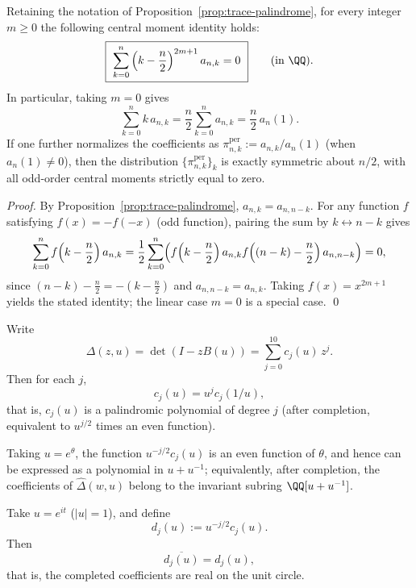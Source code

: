 \begin{corollary}\label{cor:trace-central-moments-zero}
Retaining the notation of Proposition~\ref{prop:trace-palindrome}, for every integer \(m\ge 0\) the following central moment identity holds:
$$
\boxed{\ \sum_{k=0}^{n}\left(k-\frac{n}{2}\right)^{2m+1}a_{n,k}=0\ }\qquad(\text{in }\QQ).
$$
In particular, taking \(m=0\) gives
$$
\sum_{k=0}^{n}k\,a_{n,k}=\frac{n}{2}\sum_{k=0}^{n}a_{n,k}=\frac{n}{2}\,a_n(1).
$$
If one further normalizes the coefficients as \(\pi^{\mathrm{per}}_{n,k}:=a_{n,k}/a_n(1)\) (when \(a_n(1)\neq 0\)), then the distribution \(\{\pi^{\mathrm{per}}_{n,k}\}_k\) is exactly symmetric about \(n/2\), with all odd-order central moments strictly equal to zero.
\end{corollary}
\begin{proof}
By Proposition~\ref{prop:trace-palindrome}, \(a_{n,k}=a_{n,n-k}\).
For any function \(f\) satisfying \(f(x)=-f(-x)\) (odd function), pairing the sum by \(k\leftrightarrow n-k\) gives
$$
\sum_{k=0}^{n} f\!\left(k-\frac{n}{2}\right)a_{n,k}
=\frac12\sum_{k=0}^{n}\Bigl(
f\!\left(k-\frac{n}{2}\right)a_{n,k}
f\!\left((n-k)-\frac{n}{2}\right)a_{n,n-k}
\Bigr)=0,
$$
since \((n-k)-\frac{n}{2}=-(k-\frac{n}{2})\) and \(a_{n,n-k}=a_{n,k}\).
Taking \(f(x)=x^{2m+1}\) yields the stated identity; the linear case \(m=0\) is a special case. \qed
\end{proof}

\begin{corollary}\label{cor:delta-coeff-palindrome}
Write
\[
\Delta(z,u)=\det(I-zB(u))=\sum_{j=0}^{10}c_j(u)\,z^j.
\]
Then for each $j$,
\[
c_j(u)=u^j c_j(1/u),
\]
that is, $c_j(u)$ is a palindromic polynomial of degree $j$ (after completion, equivalent to $u^{j/2}$ times an even function).
\end{corollary}

\begin{remark}
Taking $u=e^\theta$, the function $u^{-j/2}c_j(u)$ is an even function of $\theta$, and hence can be expressed as a polynomial in $u+u^{-1}$; equivalently, after completion, the coefficients of $\widehat{\Delta}(w,u)$ belong to the invariant subring $\QQ[u+u^{-1}]$.
\end{remark}

\begin{corollary}\label{cor:completion-real-line}
Take $u=e^{it}$ ($|u|=1$), and define
\[
d_j(u):=u^{-j/2}c_j(u).
\]
Then
\[
\overline{d_j(u)}=d_j(u),
\]
that is, the completed coefficients are real on the unit circle.
\end{corollary}
